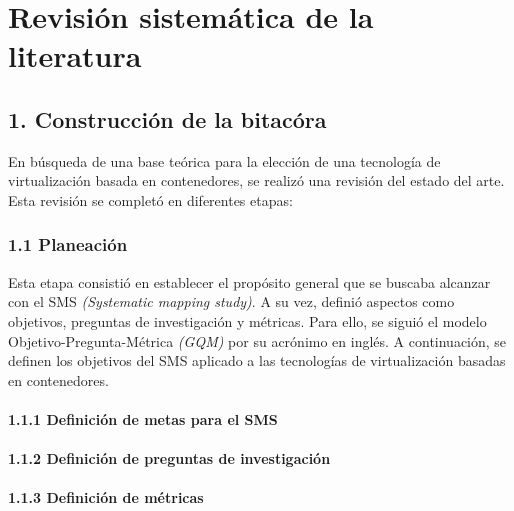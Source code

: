 \chapter*{Revisión sistemática de la literatura}
\label{cap:revisionLiteratura}

\section*{1. Construcción de la bitacóra}
\label{cap:bitacora}
En búsqueda de una base teórica para la elección de una tecnología de virtualización basada en contenedores, 
se realizó una revisión del estado del arte. Esta revisión se completó en diferentes etapas: 

\subsection*{1.1 Planeación}
\label{cap:planeacion}
Esta etapa consistió en establecer el propósito general que se buscaba 
alcanzar con el SMS \textit{(Systematic mapping study)}.  A su vez, definió aspectos 
como objetivos, preguntas de investigación y métricas. Para ello, se siguió el 
modelo Objetivo-Pregunta-Métrica \textit{(GQM)} por su acrónimo en inglés. A continuación, 
se definen los objetivos del SMS aplicado a las tecnologías de virtualización basadas en contenedores.

\subsubsection{1.1.1 Definición de metas para el SMS}
\label{cap:metasSMS}



\subsubsection{1.1.2 Definición de preguntas de investigación}
\label{cap:preguntasInvestigacion}



\subsubsection{1.1.3 Definición de métricas}
\label{cap:metricasSMS}

